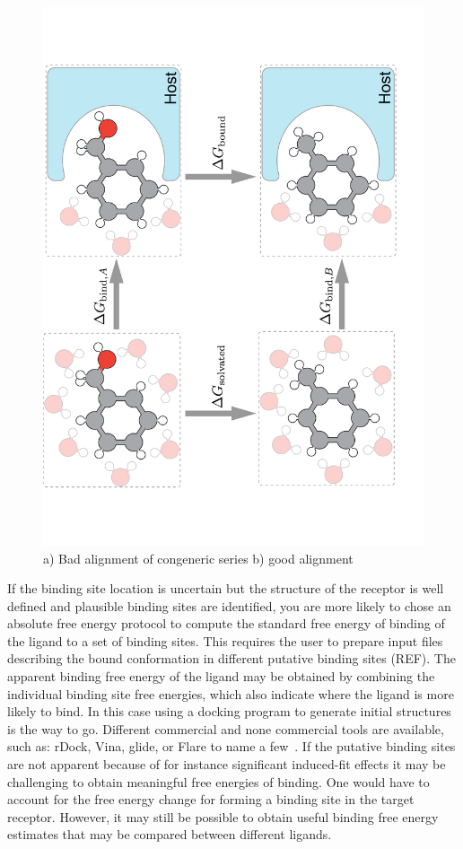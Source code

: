 \documentclass[9pt,bestpractices]{livecoms}
\begin{document}
\begin{figure}
    \includegraphics[width=0.95\linewidth]{paper/figures/fig2/Fig2.pdf}
    \caption{a) Bad alignment of congeneric series b) good alignment}
    \label{fig:fig1}
\end{figure}

If the binding site location is uncertain but the structure of the receptor is well defined and plausible binding sites are identified, you are more likely to chose an absolute free energy protocol to compute the standard free energy of binding of the ligand to a set of binding sites. This requires the user to prepare input files describing the bound conformation in different putative binding sites (REF). The apparent binding free energy of the ligand may be obtained by combining the individual binding site free energies, which also indicate where the ligand is more likely to bind. In this case using a docking program to generate initial structures is the way to go. Different commercial and none commercial tools are available, such as: rDock, Vina, glide, or Flare to name a few~\cite{rDock, Vina, Glide, Flare}. 
If the putative binding sites are not apparent because of for instance significant induced-fit effects it may be challenging to obtain meaningful free energies of binding. One would have to account for the free energy change for forming a binding site in the target receptor. However, it may still be possible to obtain useful binding free energy estimates that may be compared between different ligands.  
\end{document}
